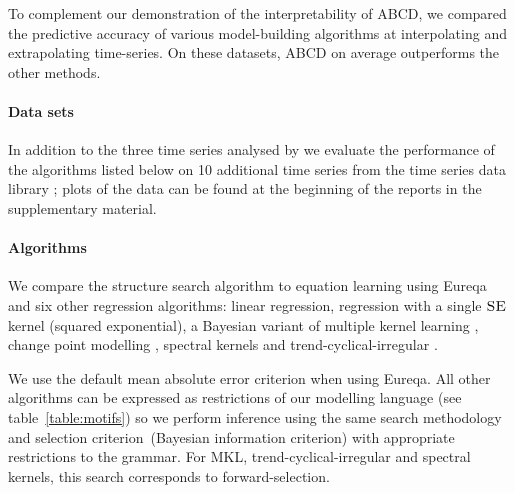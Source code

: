 \documentclass[letterpaper]{article}
\def\eg{e.g.\ }
\newcommand{\procedurename}{ABCD}
\begin{document}
To complement our demonstration of the interpretability of \procedurename{}, we compared the predictive accuracy of various model-building algorithms at interpolating and extrapolating time-series.
On these datasets, \procedurename{} on average outperforms the other methods.%

\paragraph{Data sets}

In addition to the three time series analysed by \cite{DuvLloGroetal13} we evaluate the performance of the algorithms listed below on 10 additional time series from the time series data library \citep{TSDL}; plots of the data can be found at the beginning of the reports in the supplementary material.

\paragraph{Algorithms}

We compare the structure search algorithm to equation learning using Eureqa \citep{Eureqa} and six other regression algorithms: linear regression, \gp{} regression with a single ${\textsc{SE}}$ kernel (squared exponential), a Bayesian variant of multiple kernel learning \citep{bach2004multiple}, change point modelling
\citep{garnett2010sequential, FoxDunson:NIPS2012}, spectral kernels \citep{WilAda13} and trend-cyclical-irregular \citep[e.g.][]{lind2006basic}.

We use the default mean absolute error criterion when using Eureqa.
All other algorithms can be expressed as restrictions of our modelling language (see table~\ref{table:motifs}) so we perform inference using the same search methodology and selection criterion\footnotemark~(Bayesian information criterion) with appropriate restrictions to the grammar.
For MKL, trend-cyclical-irregular and spectral kernels, this search corresponds to forward-selection.
\end{document}
